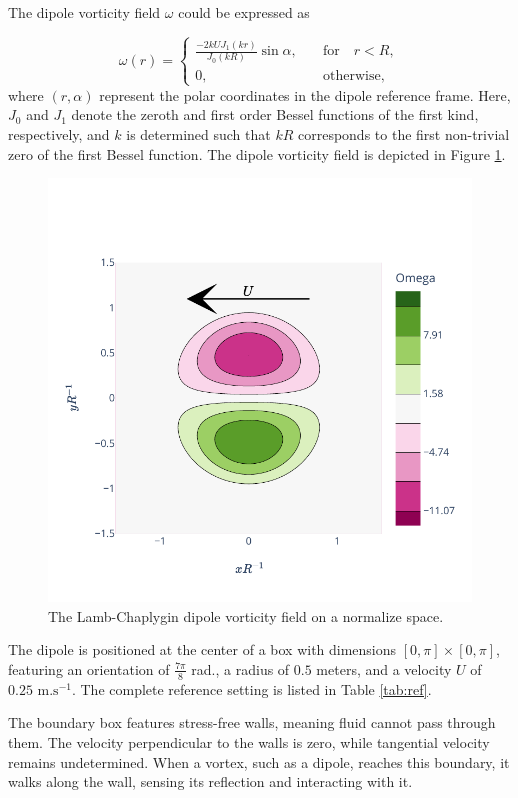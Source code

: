 The dipole vorticity field $\omega$ could be expressed as

\begin{equation*}
	\omega(r) = \begin{cases}
		\frac{-2 k U J_1(kr)}{J_0(kR)} \sin \alpha, \quad & \text{for} \quad  r < R, \\
		0, \quad                                          & \text{otherwise},
	\end{cases}
\end{equation*}where $(r, \alpha)$ represent the polar coordinates in the dipole reference frame. Here, $J_0$ and $J_1$ denote the zeroth and first order Bessel functions of the first kind, respectively, and $k$ is determined such that $kR$ corresponds to the first non-trivial zero of the first Bessel function.  The dipole vorticity field is depicted in Figure \ref{fig:lamb_dipole}.

\begin{figure}[ht]
	\centering
	\includegraphics[width=0.6\linewidth]{images/app2d/lamb.pdf}
	\caption{The Lamb-Chaplygin dipole vorticity field on a normalize space.}
	\label{fig:lamb_dipole}
\end{figure}

The dipole is positioned at the center of a box with dimensions $[0, \pi] \times [0, \pi]$, featuring an orientation of $\frac{7\pi}{8}$ rad., a radius of $0.5$ meters, and a velocity $U$ of $0.25 \text{ m.s}^{-1}$. The complete reference setting is listed in Table \ref{tab:ref}.

The boundary box features stress-free walls, meaning fluid cannot pass through them. The velocity perpendicular to the walls is zero, while tangential velocity remains undetermined. When a vortex, such as a dipole, reaches this boundary, it walks along the wall, sensing its reflection and interacting with it.

